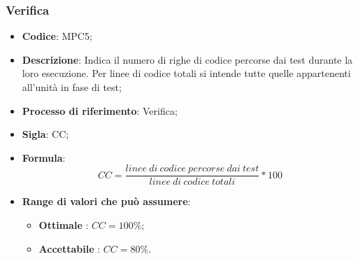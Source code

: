 \subsubsection{Verifica}
\vspace{-1cm}
\begin{itemize}
	\item \textbf{Codice}: MPC5;
	\item \textbf{Descrizione}: Indica il numero di righe di codice percorse dai test durante la loro
esecuzione. Per linee di codice totali si intende tutte quelle appartenenti all'unità in fase di test;
	\item \textbf{Processo di riferimento}: Verifica;
	\item \textbf{Sigla}: CC;
	\item \textbf{Formula}: \[ CC = \frac{linee \ di \ codice \ percorse \ dai \ test}{linee \ di \ codice \ totali} \ast 100\]
	\item \textbf{Range di valori che può assumere}: 
		\begin{itemize}
			\item \textbf{Ottimale} : $CC = 100 \%$;
			\item \textbf{Accettabile} : $CC = 80 \%$.
		\end{itemize}
\end{itemize}

